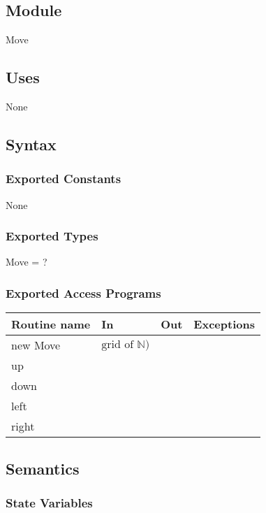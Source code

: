 \documentclass[12pt]{article}
\begin{document}
\subsection*{Module}

Move

\subsection* {Uses}

None

\subsection* {Syntax}

\subsubsection* {Exported Constants}

None

\subsubsection* {Exported Types}

Move = ?

\subsubsection* {Exported Access Programs}

\begin{tabular}{| l | l | l | p{5cm} |}
  \hline
  \textbf{Routine name} & \textbf{In} & \textbf{Out} & \textbf{Exceptions}\\
  \hline
  new Move & $\text{grid of } \mathbb{N})$ & & \\
  \hline
  up & & & \\
  \hline
  down & & & \\
  \hline
  left & & & \\
  \hline
  right & & & \\
  \hline
  
\end{tabular}

\subsection* {Semantics}

\subsubsection* {State Variables}
\end{document}
